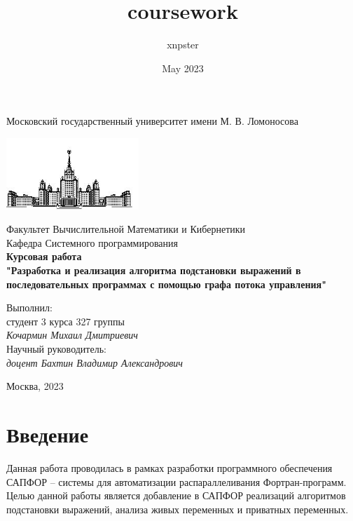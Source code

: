 \documentclass{article}
\title{coursework}
\author{xnpster}
\date{May 2023}
\begin{document}
\lstset{style=mystyle}


\begin{titlepage}
\begin{center}
    Московский государственный университет имени М. В. Ломоносова

    \includegraphics[width=50mm]{msu_title.png}

    \bigskip
    Факультет Вычислительной Математики и Кибернетики\\
    Кафедра Системного программирования\\[10mm]
    
    \textsf{\large\bfseries
        Курсовая работа\\
        "Разработка и реализация алгоритма подстановки выражений в последовательных программах с помощью графа потока управления"\\[20mm]
    }
    
    \begin{flushright}
        \parbox{0.5\textwidth}{
        	Выполнил:\\
        	студент 3 курса 327 группы \\
        	\emph{Кочармин Михаил Дмитриевич}\\[5mm]
            Научный руководитель:\\
        	\emph{доцент Бахтин Владимир Александрович} \\
    }
    \end{flushright}
    \vspace{\fill}
    Москва, 2023
\end{center}
\end{titlepage}

\newpage
\tableofcontents
\newpage

\section{Введение}
Данная работа проводилась в рамках разработки программного обеспечения САПФОР 
-- системы для автоматизации распараллеливания Фортран-программ. Целью данной работы
является добавление в САПФОР реализаций алгоритмов подстановки выражений, анализа живых переменных и приватных переменных.
\end{document}
